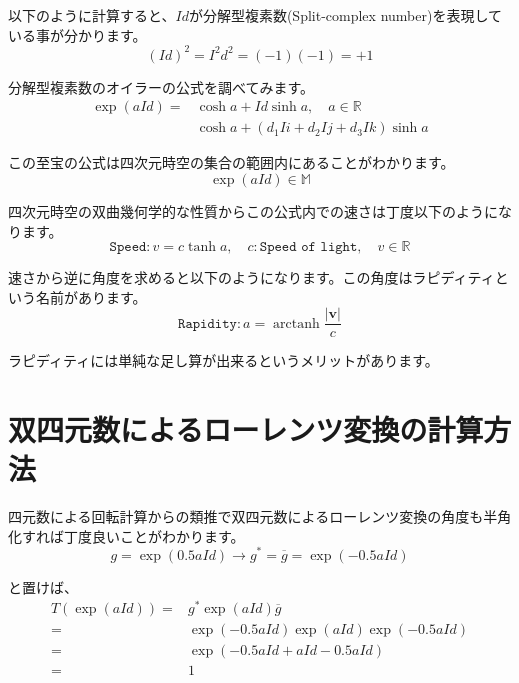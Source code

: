 \documentclass[a4paper,12pt,notitlepage]{jsreport}
\DeclareMathOperator\arctanh{arctanh}
\begin{document}
以下のように計算すると、$Id$が分解型複素数(Split-complex number)を表現している事が分かります。
\begin{equation}
  (Id)^2=I^2d^2=(-1)(-1)=+1
\end{equation}

分解型複素数のオイラーの公式を調べてみます。
\begin{equation}
  \begin{split}
    \exp(aId)=&\cosh a+Id\sinh a,\quad a\in\mathbb{R}\\
    &\cosh a+(d_1Ii+d_2Ij+d_3Ik)\sinh a
  \end{split}
\end{equation}

この至宝の公式は四次元時空の集合の範囲内にあることがわかります。
\begin{equation}
  \exp(aId)\in\mathbb{M}
\end{equation}

四次元時空の双曲幾何学的な性質からこの公式内での速さは丁度以下のようになります。
\begin{equation}
  \texttt{Speed}:v=c\tanh a,\quad c:\texttt{Speed of light},\quad v\in\mathbb{R}
\end{equation}

速さから逆に角度を求めると以下のようになります。この角度はラピディティという名前があります。
\begin{equation}
  \texttt{Rapidity}:a=\arctanh\frac{|\bm{v}|}{c}
\end{equation}

ラピディティには単純な足し算が出来るというメリットがあります。

\section{双四元数によるローレンツ変換の計算方法}

四元数による回転計算からの類推で双四元数によるローレンツ変換の角度も半角化すれば丁度良いことがわかります。
\begin{equation}
  g=\exp(0.5aId) \to g^*=\overline{g}=\exp(-0.5aId)
\end{equation}

と置けば、
\begin{equation}
  \begin{split}
    T(\exp(aId))=&g^*\exp(aId)\overline{g}\\
    =&\exp(-0.5aId)\exp(aId)\exp(-0.5aId)\\
    =&\exp(-0.5aId+aId-0.5aId)\\
    =&1
  \end{split}
\end{equation}
\end{document}
